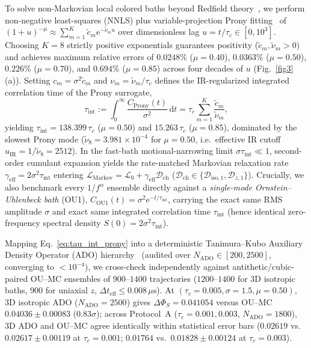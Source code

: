 \documentclass[twocolumn,10pt,amsmath,amssymb,floatfix]{revtex4-2}
\theoremstyle{plain}
\theoremstyle{definition}
\newcommand{\dd}{\mathrm{d}}
\newcommand{\ee}{\mathrm{e}}
\newcommand{\DeltaPhi}{\Delta\Phi_S}
\begin{document}
To solve non-Markovian local colored baths beyond Redfield theory~\cite{Fay2019JCP,Tanimura2020JCP}, we perform non-negative least-squares (NNLS) plus variable-projection Prony fitting~\cite{Tanimura1989JPSJ,Tanimura2020JCP} of $(1 + u)^{-\mu} \approx \sum_{m=1}^K \tilde{c}_m \ee^{-\tilde{\nu}_m u}$ over dimensionless lag $u = t/\tau_c \in [0, 10^3]$. Choosing $K=8$ strictly positive exponentials guarantees positivity ($\tilde{c}_m, \tilde{\nu}_m > 0$) and achieves maximum relative errors of $0.0248\%$ ($\mu=0.40$), $0.0363\%$ ($\mu=0.50$), $0.226\%$ ($\mu=0.70$), and $0.694\%$ ($\mu=0.85$) across four decades of $u$ (Fig.~\ref{fig3}(a)). Setting $c_m = \sigma^2 \tilde{c}_m$ and $\nu_m = \tilde{\nu}_m / \tau_c$ defines the IR-regularized integrated correlation time of the Prony surrogate,
\begin{equation}
\label{eq:tau_int_prony}
\tau_{\mathrm{int}} := \int_0^\infty \frac{C_{\mathrm{Prony}}(t)}{\sigma^2}\,\dd t = \tau_c \sum_{m=1}^K \frac{\tilde{c}_m}{\tilde{\nu}_m},
\end{equation}
yielding $\tau_{\mathrm{int}} = 138.399\,\tau_c$ ($\mu=0.50$) and $15.263\,\tau_c$ ($\mu=0.85$), dominated by the slowest Prony mode ($\tilde{\nu}_8 = 3.981\times 10^{-4}$ for $\mu=0.50$, i.e.\ effective IR cutoff $u_{\mathrm{IR}} = 1/\tilde{\nu}_8 = 2512$). In the fast-bath motional-narrowing limit $\sigma\tau_{\mathrm{int}} \ll 1$, second-order cumulant expansion yields the rate-matched Markovian relaxation rate $\gamma_{\mathrm{eff}} = 2\sigma^2 \tau_{\mathrm{int}}$ entering $\mathcal{L}_{\mathrm{Markov}} = \mathcal{L}_0 + \gamma_{\mathrm{eff}}\mathcal{D}_{\mathrm{ch}}$ ($\mathcal{D}_{\mathrm{ch}} \in \{\mathcal{D}_{\mathrm{iso},1}, \mathcal{D}_{z,1}\}$). Crucially, we also benchmark every $1/f^\alpha$ ensemble directly against a \emph{single-mode Ornstein--Uhlenbeck bath} (OU1), $C_{\mathrm{OU1}}(t) = \sigma^2 \ee^{-t/\tau_{\mathrm{int}}}$, carrying the exact same RMS amplitude $\sigma$ and exact same integrated correlation time $\tau_{\mathrm{int}}$ (hence identical zero-frequency spectral density $S(0) = 2\sigma^2\tau_{\mathrm{int}}$).

Mapping Eq.~\eqref{eq:tau_int_prony} into a deterministic Tanimura--Kubo Auxiliary Density Operator (ADO) hierarchy~\cite{Ishizaki2005JPSJ,Tanimura2020JCP} (audited over $N_{\mathrm{ADO}} \in [200, 2500]$, converging to $<10^{-4}$), we cross-check independently against antithetic/cubic-paired OU--MC ensembles of $900$--$1400$ trajectories ($1200$--$1400$ for 3D isotropic baths, $900$ for uniaxial $z$, $\Delta t_{\mathrm{eff}} \le 0.008\,\mu\text{s}$). At $(\tau_c = 0.005, \sigma = 1.5, \mu = 0.50)$, 3D isotropic ADO ($N_{\mathrm{ADO}}=2500$) gives $\DeltaPhi = 0.041054$ versus OU--MC $0.04036 \pm 0.00083$ ($0.83\sigma$); across Protocol~A ($\tau_c = 0.001, 0.003$, $N_{\mathrm{ADO}}=1800$), 3D ADO and OU--MC agree identically within statistical error bars ($0.02619$ vs.\ $0.02617 \pm 0.00119$ at $\tau_c=0.001$; $0.01764$ vs.\ $0.01828 \pm 0.00124$ at $\tau_c=0.003$).
\end{document}
